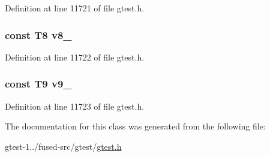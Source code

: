 \-Definition at line 11721 of file gtest.\-h.

\hypertarget{classtesting_1_1internal_1_1ValueArray29_a596bc5260b2474271d1f6910ff6f665d}{
\subsubsection[{v8\-\_\-}]{\setlength{\rightskip}{0pt plus 5cm}const \-T8 {\bf v8\-\_\-}}}\label{dc/db6/classtesting_1_1internal_1_1ValueArray29_a596bc5260b2474271d1f6910ff6f665d}


\-Definition at line 11722 of file gtest.\-h.

\hypertarget{classtesting_1_1internal_1_1ValueArray29_a6356e16cf54a9dfac8525f20242af31e}{
\subsubsection[{v9\-\_\-}]{\setlength{\rightskip}{0pt plus 5cm}const \-T9 {\bf v9\-\_\-}}}\label{dc/db6/classtesting_1_1internal_1_1ValueArray29_a6356e16cf54a9dfac8525f20242af31e}


\-Definition at line 11723 of file gtest.\-h.



\-The documentation for this class was generated from the following file\-:\begin{DoxyCompactItemize}
\item 
gtest-\/1../fused-\/src/gtest/\hyperlink{fused-src_2gtest_2gtest_8h}{gtest.\-h}\end{DoxyCompactItemize}
